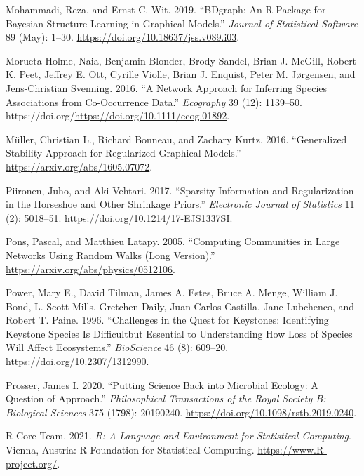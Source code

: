 \documentclass[
  a4paper,
]{article}
\newlength{\cslhangindent}
\newlength{\cslentryspacingunit} %
\newenvironment{CSLReferences}[2] %
 {%
  \setlength{\parindent}{0pt}
  \ifodd #1
  \let\oldpar\par
  \def\par{\hangindent=\cslhangindent\oldpar}
  \fi
  \setlength{\parskip}{#2\cslentryspacingunit}
 }%
 {}
\begin{document}
\begin{CSLReferences}{1}{0}
\leavevmode{}%
Mohammadi, Reza, and Ernst C. Wit. 2019. {``BDgraph: An R Package for
Bayesian Structure Learning in Graphical Models.''} \emph{Journal of
Statistical Software} 89 (May): 1--30.
\url{https://doi.org/10.18637/jss.v089.i03}.

\leavevmode{}%
Morueta-Holme, Naia, Benjamin Blonder, Brody Sandel, Brian J. McGill,
Robert K. Peet, Jeffrey E. Ott, Cyrille Violle, Brian J. Enquist, Peter
M. Jørgensen, and Jens-Christian Svenning. 2016. {``A Network Approach
for Inferring Species Associations from Co-Occurrence Data.''}
\emph{Ecography} 39 (12): 1139--50.
https://doi.org/\url{https://doi.org/10.1111/ecog.01892}.

\leavevmode{}%
Müller, Christian L., Richard Bonneau, and Zachary Kurtz. 2016.
{``Generalized Stability Approach for Regularized Graphical Models.''}
\url{https://arxiv.org/abs/1605.07072}.

\leavevmode{}%
Piironen, Juho, and Aki Vehtari. 2017. {``Sparsity Information and
Regularization in the Horseshoe and Other Shrinkage Priors.''}
\emph{Electronic Journal of Statistics} 11 (2): 5018--51.
\url{https://doi.org/10.1214/17-EJS1337SI}.

\leavevmode{}%
Pons, Pascal, and Matthieu Latapy. 2005. {``Computing Communities in
Large Networks Using Random Walks (Long Version).''}
\url{https://arxiv.org/abs/physics/0512106}.

\leavevmode{}%
Power, Mary E., David Tilman, James A. Estes, Bruce A. Menge, William J.
Bond, L. Scott Mills, Gretchen Daily, Juan Carlos Castilla, Jane
Lubchenco, and Robert T. Paine. 1996. {``Challenges in the Quest for
Keystones: Identifying Keystone Species Is Difficult{\textemdash}but
Essential to Understanding How Loss of Species Will Affect
Ecosystems.''} \emph{BioScience} 46 (8): 609--20.
\url{https://doi.org/10.2307/1312990}.

\leavevmode{}%
Prosser, James I. 2020. {``Putting Science Back into Microbial Ecology:
A Question of Approach.''} \emph{Philosophical Transactions of the Royal
Society B: Biological Sciences} 375 (1798): 20190240.
\url{https://doi.org/10.1098/rstb.2019.0240}.

\leavevmode{}%
R Core Team. 2021. \emph{R: A Language and Environment for Statistical
Computing}. Vienna, Austria: R Foundation for Statistical Computing.
\url{https://www.R-project.org/}.


\end{CSLReferences}
\end{document}
